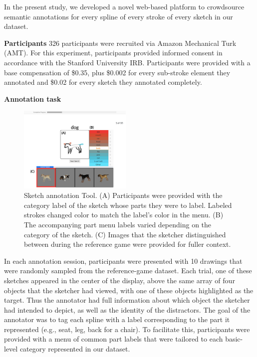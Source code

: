 \documentclass[10pt,letterpaper]{article}
\newcommand{\jefan}[1]{{\color{blue}{[jefan: #1]}}}
\begin{document}
In the present study, we developed a novel web-based platform to crowdsource semantic annotations for every spline of every stroke of every sketch in our dataset. 

\noindent \textbf{Participants} \hspace{3mm} 
326 participants were recruited via Amazon Mechanical Turk (AMT).  
For this experiment, participants provided informed consent in accordance with the Stanford University IRB. 
Participants were provided with a base compensation of \$0.35, plus \$0.002 for every sub-stroke element they annotated and \$0.02 for every sketch they annotated completely. 

\noindent \textbf{Annotation task} \hspace{3mm} \jefan{Would be good to put a cleaned up version of the annotation task interface around here.} 

\begin{figure}[htbp]
\centering
\includegraphics[width=0.48\textwidth]{figures/annotation_tool.pdf}
\caption{Sketch annotation Tool. (A) Participants were provided with the category label of the sketch whose parts they were to label. Labeled strokes changed color to match the label's color in the menu. (B) The accompanying part menu labels varied depending on the category of the sketch. (C) Images that the sketcher distinguished between during the reference game were provided for fuller context.}
\label{refgame_performance}
\end{figure}

In each annotation session, participants were presented with 10 drawings that were randomly sampled from the reference-game dataset. 
Each trial, one of these sketches appeared in the center of the display, above the same array of four objects that the sketcher had viewed, with one of these objects highlighted as the target. 
Thus the annotator had full information about which object the sketcher had intended to depict, as well as the identity of the distractors. 
The goal of the annotator was to tag each spline with a label corresponding to the part it represented (e.g., seat, leg, back for a chair). 
To facilitate this, participants were provided with a menu of common part labels that were tailored to each basic-level category represented in our dataset. \jefan{It would be good to have a table containing the part labels that were provided for each category.}
\end{document}
